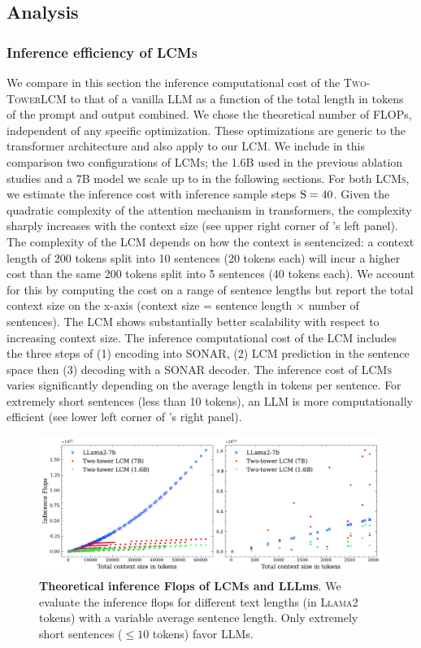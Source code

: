 \documentclass[twoside,11pt]{fairmeta}
\newcommand{\llm}{\textsc{LLM}\xspace}
\newcommand{\llamatwo}{\textsc{Llama2}\xspace}
\newcommand{\sonar}{\textsc{SONAR}\xspace}
\newcommand{\lcm}{\textsc{LCM}\xspace}
\newcommand{\lcms}{\textsc{LCMs}\xspace}
\newcommand{\twotower}{\textsc{Two-Tower}\xspace}
\def\rS{{\textnormal{S}}}
\begin{document}
\subsection{Analysis}
\label{sec:analysis}

\subsubsection{Inference efficiency of \lcms}
We compare in this section the inference computational cost of the \twotower \lcm to that of a vanilla LLM as a function of the total length in tokens of the prompt and output combined. We chose the theoretical number of FLOPs, independent of any specific optimization. These optimizations are generic to the transformer architecture and also apply to our \lcm. 
We include in this comparison two configurations of \lcms; the 1.6B used in the previous ablation studies and a 7B model we scale up to in the following sections. For both \lcms, we estimate the inference cost with inference sample steps $\rS=40$.
Given the quadratic complexity of the attention mechanism in transformers, the complexity sharply increases with the context size (see upper right corner of 's left panel). 
The complexity of the \lcm depends on how the context is sentencized: a context length of 200 tokens split into 10 sentences (20 tokens each) will incur a higher cost than the same 200 tokens split into 5 sentences (40 tokens each). We account for this by computing the cost on a range of sentence lengths but report the total context size on the x-axis (context size = sentence length $\times$ number of sentences).
The \lcm  shows substantially better scalability with respect to increasing context size. The inference computational cost of the \lcm includes the three steps of (1) encoding into \sonar, (2) \lcm  prediction in the sentence space then (3) decoding with a \sonar decoder. The inference cost of \lcms varies significantly depending on the average length in tokens per sentence. 
For extremely short sentences (less than 10 tokens), an \llm is more computationally efficient (see lower left corner of 's right panel). 
\begin{figure}
    \centering
    \includegraphics[width=1\linewidth]{figures/lineplots/th_flops.pdf}
    \caption{\textbf{Theoretical inference Flops of \lcms and LLLms}. We evaluate the inference flops for different text lengths (in \llamatwo tokens) with a variable average sentence length. Only extremely short sentences ($\le 10$ tokens) favor LLMs.}
    \label{fig:ablation:flops}
\end{figure}
\end{document}
